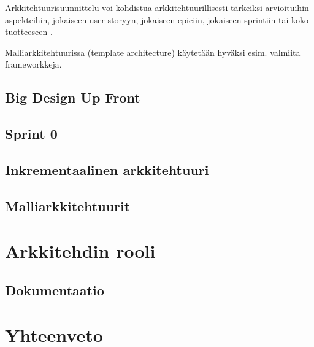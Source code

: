 Arkkitehtuurisuunnittelu voi kohdistua arkkitehtuurillisesti tärkeiksi arvioituihin  aspekteihin, jokaiseen user storyyn, jokaiseen epiciin, jokaiseen sprintiin tai koko tuotteeseen \cite{rost_distilling_2015}.

Malliarkkitehtuurissa (template architecture) käytetään hyväksi esim. valmiita frameworkkeja.


\section{Big Design Up Front}
\section{Sprint 0}
\section{Inkrementaalinen arkkitehtuuri}
\section{Malliarkkitehtuurit}



\chapter{Arkkitehdin rooli}
\section{Dokumentaatio}
\chapter{Yhteenveto}
